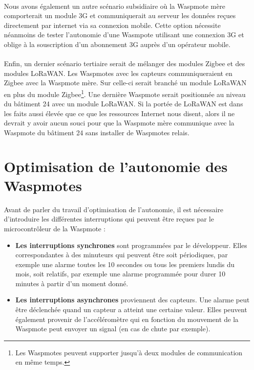     \paragraph{} Nous avons également un autre scénario subsidiaire où la Waspmote mère comporterait un module 3G et communiquerait au serveur les données reçues directement par internet via sa connexion mobile. Cette option nécessite néanmoins de tester l'autonomie d'une Wasmpote utilisant une connexion 3G et oblige à la souscription d'un abonnement 3G auprès d'un opérateur mobile. 
    
    \paragraph{} Enfin, un dernier scénario tertiaire serait de mélanger des modules Zigbee et des modules LoRaWAN. Les Waspmotes avec les capteurs communiqueraient en Zigbee avec la Waspmote mère. Sur celle-ci serait branché un module LoRaWAN en plus du module Zigbee\footnote{Les Waspmotes peuvent supporter jusqu'à deux modules de communication en même temps.}. Une dernière Waspmote serait positionnée au niveau du bâtiment 24 avec un module LoRaWAN. Si la portée de LoRaWAN est dans les faits aussi élevée que ce que les ressources Internet nous disent, alors il ne devrait y avoir aucun souci pour que la Waspmote mère communique avec la Waspmote du bâtiment 24 sans installer de Waspmotes relais. 



\section{Optimisation de l'autonomie des Waspmotes}
    \paragraph{} Avant de parler du travail d'optimisation de l'autonomie, il est nécessaire d'introduire les différentes interruptions qui peuvent être reçues par le microcontrôleur de la Waspmote :

    \begin{itemize}
        \item \textbf{Les interruptions synchrones} sont programmées par le développeur. Elles correspondantes à des minuteurs qui peuvent être soit périodiques, par exemple une alarme toutes les 10 secondes ou tous les premiers lundis du mois, soit relatifs, par exemple une alarme programmée pour durer 10 minutes à partir d'un moment donné.
        \item \textbf{Les interruptions asynchrones} proviennent des capteurs. Une alarme peut être déclenchée quand un capteur a atteint une certaine valeur. Elles peuvent également provenir de l'accéléromètre qui en fonction du mouvement de la Waspmote peut envoyer un signal (en cas de chute par exemple).
    \end{itemize}

